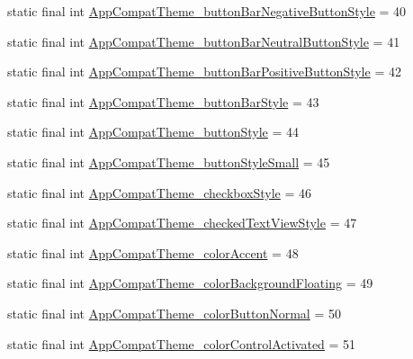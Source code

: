 \begin{DoxyCompactItemize}
\item 
static final int \mbox{\hyperlink{classandroid_1_1support_1_1design_1_1R_1_1styleable_a9832913cae5df0c7276bdeba84d493a5}{App\+Compat\+Theme\+\_\+button\+Bar\+Negative\+Button\+Style}} = 40
\item 
static final int \mbox{\hyperlink{classandroid_1_1support_1_1design_1_1R_1_1styleable_a93c27bab63c81b49f205d10c88d85bb9}{App\+Compat\+Theme\+\_\+button\+Bar\+Neutral\+Button\+Style}} = 41
\item 
static final int \mbox{\hyperlink{classandroid_1_1support_1_1design_1_1R_1_1styleable_a7a2887419ca217a16c24636def6eac17}{App\+Compat\+Theme\+\_\+button\+Bar\+Positive\+Button\+Style}} = 42
\item 
static final int \mbox{\hyperlink{classandroid_1_1support_1_1design_1_1R_1_1styleable_a891b495744b4a474aa003b6ed3429ccc}{App\+Compat\+Theme\+\_\+button\+Bar\+Style}} = 43
\item 
static final int \mbox{\hyperlink{classandroid_1_1support_1_1design_1_1R_1_1styleable_a0562e3f3b8f9c5242aea25e93a6d44d6}{App\+Compat\+Theme\+\_\+button\+Style}} = 44
\item 
static final int \mbox{\hyperlink{classandroid_1_1support_1_1design_1_1R_1_1styleable_ad0a87f4f0dcf5a7b2fcaa746d8dc2d20}{App\+Compat\+Theme\+\_\+button\+Style\+Small}} = 45
\item 
static final int \mbox{\hyperlink{classandroid_1_1support_1_1design_1_1R_1_1styleable_a60be24a34d157842da7c8e56ce479a18}{App\+Compat\+Theme\+\_\+checkbox\+Style}} = 46
\item 
static final int \mbox{\hyperlink{classandroid_1_1support_1_1design_1_1R_1_1styleable_aaf59cc8afbc9b83e200636e9d7fec027}{App\+Compat\+Theme\+\_\+checked\+Text\+View\+Style}} = 47
\item 
static final int \mbox{\hyperlink{classandroid_1_1support_1_1design_1_1R_1_1styleable_a488749863ea5bfa0082c9ea7517ec218}{App\+Compat\+Theme\+\_\+color\+Accent}} = 48
\item 
static final int \mbox{\hyperlink{classandroid_1_1support_1_1design_1_1R_1_1styleable_aa5c2e467cdd7656d957a879184e4c51f}{App\+Compat\+Theme\+\_\+color\+Background\+Floating}} = 49
\item 
static final int \mbox{\hyperlink{classandroid_1_1support_1_1design_1_1R_1_1styleable_a1799d5258bee7b517f6cca502206a00f}{App\+Compat\+Theme\+\_\+color\+Button\+Normal}} = 50
\item 
static final int \mbox{\hyperlink{classandroid_1_1support_1_1design_1_1R_1_1styleable_a3176966cea8de8860d7df6122ddf9854}{App\+Compat\+Theme\+\_\+color\+Control\+Activated}} = 51

\end{DoxyCompactItemize}
